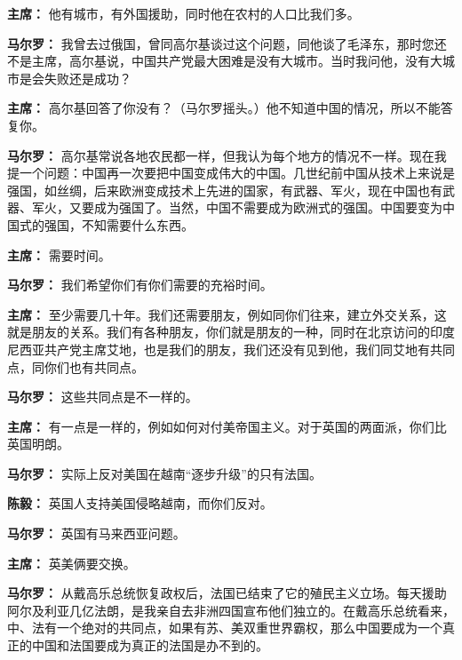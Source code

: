 \begin{list}{}
\item[\textbf{主席：}] 他有城市，有外国援助，同时他在农村的人口比我们多。

\item[\textbf{马尔罗：}] 我曾去过俄国，曾同高尔基谈过这个问题，同他谈了毛泽东，那时您还不是主席，高尔基说，中国共产党最大困难是没有大城市。当时我问他，没有大城市是会失败还是成功？

\item[\textbf{主席：}] 高尔基回答了你没有？（马尔罗摇头。）他不知道中国的情况，所以不能答复你。

\item[\textbf{马尔罗：}] 高尔基常说各地农民都一样，但我认为每个地方的情况不一样。现在我提一个问题：中国再一次要把中国变成伟大的中国。几世纪前中国从技术上来说是强国，如丝绸，后来欧洲变成技术上先进的国家，有武器、军火，现在中国也有武器、军火，又要成为强国了。当然，中国不需要成为欧洲式的强国。中国要变为中国式的强国，不知需要什么东西。

\item[\textbf{主席：}] 需要时间。

\item[\textbf{马尔罗：}] 我们希望你们有你们需要的充裕时间。

\item[\textbf{主席：}] 至少需要几十年。我们还需要朋友，例如同你们往来，建立外交关系，这就是朋友的关系。我们有各种朋友，你们就是朋友的一种，同时在北京访问的印度尼西亚共产党主席艾地，也是我们的朋友，我们还没有见到他，我们同艾地有共同点，同你们也有共同点。

\item[\textbf{马尔罗：}] 这些共同点是不一样的。

\item[\textbf{主席：}] 有一点是一样的，例如如何对付美帝国主义。对于英国的两面派，你们比英国明朗。

\item[\textbf{马尔罗：}] 实际上反对美国在越南“逐步升级”的只有法国。

\item[\textbf{陈毅：}] 英国人支持美国侵略越南，而你们反对。

\item[\textbf{马尔罗：}] 英国有马来西亚问题。

\item[\textbf{主席：}] 英美俩要交换。

\item[\textbf{马尔罗：}] 从戴高乐总统恢复政权后，法国已结束了它的殖民主义立场。每天援助阿尔及利亚几亿法朗，是我亲自去非洲四国宣布他们独立的。在戴高乐总统看来，中、法有一个绝对的共同点，如果有苏、美双重世界霸权，那么中国要成为一个真正的中国和法国要成为真正的法国是办不到的。


\end{list}
